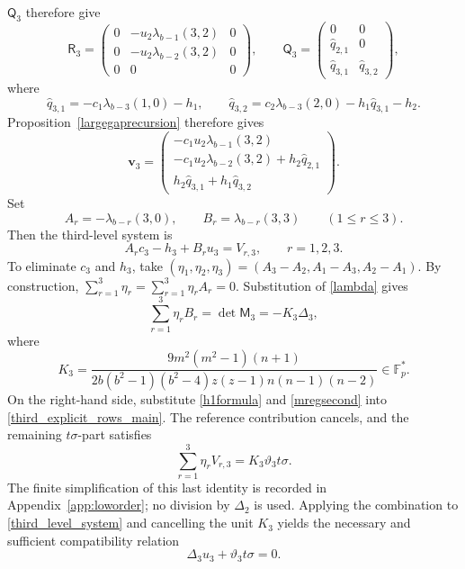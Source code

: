 \documentclass[10pt,a4paper]{amsart}
\newcommand{\F}{\mathbb{F}_p}
\begin{document}
$\mathsf Q_3$ therefore give
\[
 \mathsf R_3=
 \begin{pmatrix}
  0&-u_2\lambda_{b-1}(3,2)&0\\
  0&-u_2\lambda_{b-2}(3,2)&0\\
  0&0&0
 \end{pmatrix},\qquad
 \mathsf Q_3=
 \begin{pmatrix}
  0&0\\
  \widehat q_{2,1}&0\\
  \widehat q_{3,1}&\widehat q_{3,2}
 \end{pmatrix},
\]
where
\[
 \widehat q_{3,1}=-c_1\lambda_{b-3}(1,0)-h_1,
 \qquad
 \widehat q_{3,2}=c_2\lambda_{b-3}(2,0)
                  -h_1\widehat q_{3,1}-h_2.
\]
Proposition~\ref{largegaprecursion} therefore gives
\begin{equation}\label{third_explicit_rows_main}
 \mathbf v_3=
 \begin{pmatrix}
 -c_1u_2\lambda_{b-1}(3,2)\\
 -c_1u_2\lambda_{b-2}(3,2)+h_2\widehat q_{2,1}\\
 h_2\widehat q_{3,1}+h_1\widehat q_{3,2}
 \end{pmatrix}.
\end{equation}
Set
\[
 A_r=-\lambda_{b-r}(3,0),\qquad
 B_r=\lambda_{b-r}(3,3)\qquad(1\le r\le3).
\]
Then the third-level system is
\begin{equation}\label{third_level_system}
 A_rc_3-h_3+B_ru_3=V_{r,3},\qquad r=1,2,3.
\end{equation}
To eliminate $c_3$ and $h_3$, take
$(\eta_1,\eta_2,\eta_3)=(A_3-A_2,A_1-A_3,A_2-A_1)$.  By construction, $\sum_{r=1}^3\eta_r=\sum_{r=1}^3\eta_rA_r=0$.  Substitution of
\eqref{lambda} gives
\[
 \sum_{r=1}^3\eta_rB_r=\det \mathsf M_3=-K_3\Delta_3,
\]
where
\[
 K_3=\frac{9m^2(m^2-1)(n+1)}
 {2b(b^2-1)(b^2-4)z(z-1)n(n-1)(n-2)}\in\F^*.
\]
On the right-hand side, substitute
\eqref{h1formula} and \eqref{mregsecond} into
\eqref{third_explicit_rows_main}.  The reference contribution cancels,
and the remaining $t\sigma$-part satisfies
\[
 \sum_{r=1}^3\eta_rV_{r,3}=K_3\vartheta_3t\sigma.
\]
The finite simplification of this last identity is recorded in
Appendix~\ref{app:loworder}; no division by $\Delta_2$ is used.
Applying the combination to \eqref{third_level_system} and cancelling
the unit $K_3$ yields the necessary and sufficient compatibility
relation
\begin{equation}\label{mregthird}
 \Delta_3u_3+\vartheta_3t\sigma=0.
\end{equation}
\end{document}

